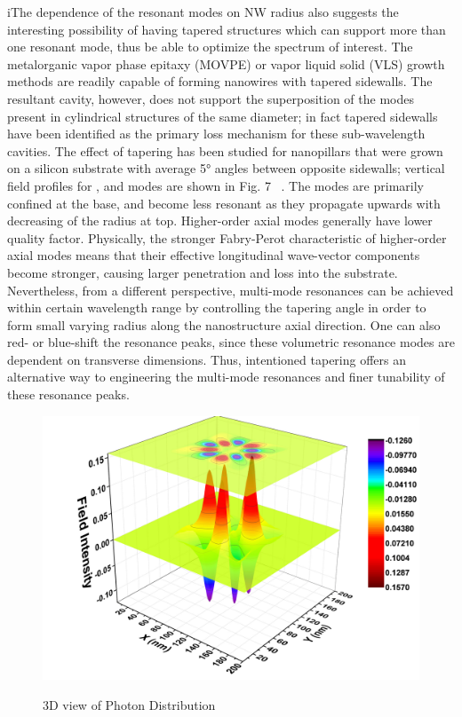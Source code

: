 iThe dependence of the resonant modes on NW radius also suggests the
interesting possibility of having tapered structures which can support more
than one resonant mode, thus be able to optimize the spectrum of interest.  The
metalorganic vapor phase epitaxy (MOVPE) or vapor liquid solid (VLS) growth
methods are readily capable of forming nanowires with tapered sidewalls. The
resultant cavity, however, does not support the superposition of the modes
present in cylindrical structures of the same diameter; in fact tapered
sidewalls have been identified as the primary loss mechanism for these
sub-wavelength cavities.  The effect of  tapering has been studied for
nanopillars that were grown on a silicon substrate with average 5° angles
between opposite sidewalls; vertical field profiles for ,  and  modes are shown
in Fig. 7 ~\cite{Chen:2011cg}. The modes are primarily confined at the base, and become less
resonant as they propagate upwards with decreasing of the radius at top.
Higher-order axial modes generally have lower quality factor. Physically, the
stronger Fabry-Perot characteristic of higher-order axial modes means that
their effective longitudinal wave-vector components become stronger, causing
larger penetration and loss into the substrate. Nevertheless, from a different
perspective, multi-mode resonances can be achieved within certain wavelength
range by controlling the tapering angle in order to form small varying radius
along the nanostructure axial direction. One can also red- or blue-shift the
resonance peaks, since these volumetric resonance modes are dependent on
transverse dimensions. Thus, intentioned tapering offers an alternative way to
engineering the multi-mode resonances and finer tunability of these resonance
peaks.


\begin{figure}
  \caption{3D view of Photon Distribution}
  \centering
  \includegraphics[width=\textwidth]{pictures/LM/photondensity2}
  \label{photondensity2}
\end{figure}


